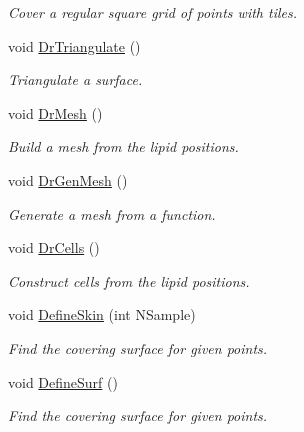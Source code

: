 \begin{DoxyCompactItemize}
\begin{DoxyCompactList}\small\item\em \-Cover a regular square grid of points with tiles. \end{DoxyCompactList}\item 
\hypertarget{classElPoly_a064da013f0a35aeb162a8f11e847117b}{void \hyperlink{classElPoly_a064da013f0a35aeb162a8f11e847117b}{\-Dr\-Triangulate} ()}\label{classElPoly_a064da013f0a35aeb162a8f11e847117b}

\begin{DoxyCompactList}\small\item\em \-Triangulate a surface. \end{DoxyCompactList}\item 
\hypertarget{classElPoly_a2c774ae632488cd2f9fe00fece284d00}{void \hyperlink{classElPoly_a2c774ae632488cd2f9fe00fece284d00}{\-Dr\-Mesh} ()}\label{classElPoly_a2c774ae632488cd2f9fe00fece284d00}

\begin{DoxyCompactList}\small\item\em \-Build a mesh from the lipid positions. \end{DoxyCompactList}\item 
\hypertarget{classElPoly_a8ff8e8575c77b1ae89dfb13d609a67cf}{void \hyperlink{classElPoly_a8ff8e8575c77b1ae89dfb13d609a67cf}{\-Dr\-Gen\-Mesh} ()}\label{classElPoly_a8ff8e8575c77b1ae89dfb13d609a67cf}

\begin{DoxyCompactList}\small\item\em \-Generate a mesh from a function. \end{DoxyCompactList}\item 
\hypertarget{classElPoly_a17706f0576f3b5d93c03ac3a5dd3dcef}{void \hyperlink{classElPoly_a17706f0576f3b5d93c03ac3a5dd3dcef}{\-Dr\-Cells} ()}\label{classElPoly_a17706f0576f3b5d93c03ac3a5dd3dcef}

\begin{DoxyCompactList}\small\item\em \-Construct cells from the lipid positions. \end{DoxyCompactList}\item 
\hypertarget{classElPoly_a6b5e62f460bcb738295e940da6ddf784}{void \hyperlink{classElPoly_a6b5e62f460bcb738295e940da6ddf784}{\-Define\-Skin} (int \-N\-Sample)}\label{classElPoly_a6b5e62f460bcb738295e940da6ddf784}

\begin{DoxyCompactList}\small\item\em \-Find the covering surface for given points. \end{DoxyCompactList}\item 
\hypertarget{classElPoly_a7c082f4da2c0b68b41f525df0173519c}{void \hyperlink{classElPoly_a7c082f4da2c0b68b41f525df0173519c}{\-Define\-Surf} ()}\label{classElPoly_a7c082f4da2c0b68b41f525df0173519c}

\begin{DoxyCompactList}\small\item\em \-Find the covering surface for given points. \end{DoxyCompactList}\end{DoxyCompactItemize}
